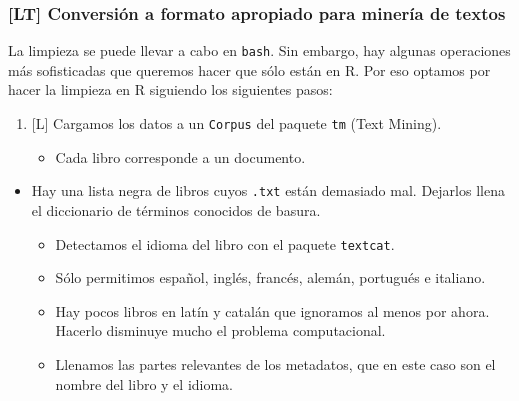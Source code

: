 \subsubsection{{[}LT{]} Conversión a formato apropiado para minería de
textos}\label{lt-conversion-a-formato-apropiado-para-mineria-de-textos}

La limpieza se puede llevar a cabo en \texttt{bash}. Sin embargo, hay
algunas operaciones más sofisticadas que queremos hacer que sólo están
en R. Por eso optamos por hacer la limpieza en R siguiendo los
siguientes pasos:

\begin{enumerate}
\def\labelenumi{\arabic{enumi}.}
\itemsep1pt\parskip0pt
\item
  {[}L{]} Cargamos los datos a un \texttt{Corpus} del paquete
  \texttt{tm} (Text Mining).

  \begin{itemize}
  \itemsep1pt\parskip0pt
  \item
    Cada libro corresponde a un documento.
  \end{itemize}
\end{enumerate}

\begin{itemize}
\itemsep1pt\parskip0pt
\item
  Hay una lista negra de libros cuyos \texttt{.txt} están demasiado mal.
  Dejarlos llena el diccionario de términos conocidos de basura.

  \begin{itemize}
  \itemsep1pt\parskip0pt
  \item
    Detectamos el idioma del libro con el paquete \texttt{textcat}.
  \item
    Sólo permitimos español, inglés, francés, alemán, portugués e
    italiano.
  \item
    Hay pocos libros en latín y catalán que ignoramos al menos por
    ahora. Hacerlo disminuye mucho el problema computacional.
  \item
    Llenamos las partes relevantes de los metadatos, que en este caso
    son el nombre del libro y el idioma.
  \end{itemize}
\end{itemize}

